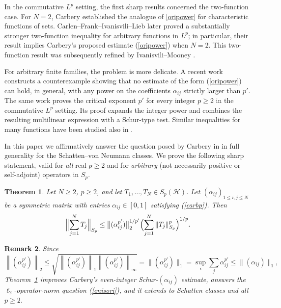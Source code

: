 \documentclass[10pt,a4paper]{amsart}
\newtheorem{theorem}{Theorem}[section]
\newtheorem{remark}[theorem]{Remark}
\newcommand{\norm}[1]{\left\lVert #1 \right\rVert}
\newcommand{\1}{\mathbf{1}}
\begin{document}
In the commutative $L^p$ setting, the first sharp results concerned the two-function case. For $N=2$, Carbery \cite[Proposition~3.1]{Carbery2009} established the analogue of \eqref{oripower} for characteristic functions of sets. Carlen--Frank--Ivanisvili--Lieb \cite{CFIL2021} later proved a substantially stronger two-function inequality for arbitrary functions in $L^p$; in particular, their result implies Carbery's proposed estimate (\ref{oripower}) when $N=2$. This two-function result was subsequently refined by Ivanisvili--Mooney \cite{IvanisviliMooney2020}. 

For arbitrary finite families, the problem is more delicate. A recent work \cite{CDPIMW2026} constructs a counterexample showing that no estimate of the form (\ref{oripower}) can hold, in general, with any power on the coefficients $\alpha_{ij}$ strictly larger than $p'$. The same work proves the critical exponent $p'$ for every integer $p\geq 2$ in the commutative $L^{p}$ setting. Its proof expands the integer power and combines the resulting multilinear expression with a Schur-type test. Similar inequalities for many functions have been studied also in \cite{CFL2020}. 


In this paper we  affirmatively answer the question posed by Carbery in \cite[Section~3.3, (3.1)]{Carbery2009} in full generality for the Schatten--von Neumann classes. We prove the following sharp statement, valid for \emph{all} real $p\geq 2$ and for \emph{arbitrary} (not necessarily positive or self-adjoint) operators in $S_{p}$. 

\begin{theorem}\label{mainthm}
Let $N\geq 2$,  $p\geq 2$,  and let $T_1,\dots,T_N\in S_p(\mathcal{H})$. Let $(\alpha_{ij})_{1\leq i,j\leq N}$ be a symmetric matrix with entries $\alpha_{ij} \in [0,1]$ satisfying (\ref{carbp}). Then
\[
\Bigl\|\sum_{j=1}^N T_j\Bigr\|_{S_p}
\leq
\bigl\|(\alpha_{ij}^{p'})\bigr\|_{2}^{1/p'}
\Bigl(\sum_{j=1}^N\|T_j\|_{S_p}^p\Bigr)^{1/p}.
\]
\end{theorem}


\begin{remark}
    Since
\[
   \norm{(\alpha_{ij}^{p'})}_{2}
   \le
   \sqrt{\norm{(\alpha_{ij}^{p'})}_{1} \norm{(\alpha_{ij}^{p'})}_{\infty}} = \|(\alpha^{p'}_{ij})\|_{1}=
   \sup_i\sum_j \alpha^{p'}_{ij}\leq \|(\alpha_{ij})\|_{1},
\]
Theorem~\ref{mainthm} improves Carbery’s even-integer Schur-$(\alpha_{ij})$ estimate,  answers the $\ell_{2}$-operator-norm question (\ref{enisori}), and it extends \cite[Theorem~1.1]{CDPIMW2026}  to Schatten classes and all $p\geq 2$. 
\end{remark}
\end{document}
